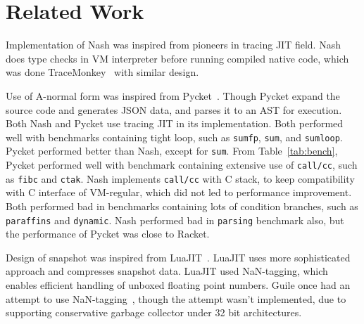 \documentclass[preprint, 10pt]{sigplanconf}
\begin{document}

\section{Related Work}
\label{sec:related}
Implementation of Nash was inspired from pioneers in tracing JIT field. Nash
does type checks in VM interpreter before running compiled native code, which
was done TraceMonkey~\cite{gal2009trace} with similar design.

Use of A-normal form was inspired from Pycket~\cite{bauman2015pycket}. Though
Pycket expand the source code and generates JSON data, and parses it to an AST
for execution.  Both Nash and Pycket use tracing JIT in its implementation. Both
performed well with benchmarks containing tight loop, such as \texttt{sumfp},
\texttt{sum}, and \texttt{sumloop}. Pycket performed better than Nash, except
for \texttt{sum}. From Table~\hyperref[tab:bench]{\ref{tab:bench}}, Pycket
performed well with benchmark containing extensive use of \texttt{call/cc}, such
as \texttt{fibc} and \texttt{ctak}. Nash implements \texttt{call/cc} with C
stack, to keep compatibility with C interface of VM-regular, which did not led
to performance improvement. Both performed bad in benchmarks containing lots of
condition branches, such as \texttt{paraffins} and \texttt{dynamic}. Nash
performed bad in \texttt{parsing} benchmark also, but the performance of Pycket
was close to Racket.

Design of snapshot was inspired from LuaJIT~\cite{pall2009ip}. LuaJIT uses more
sophisticated approach and compresses snapshot data. LuaJIT used NaN-tagging,
which enables efficient handling of unboxed floating point numbers. Guile once
had an attempt to use NaN-tagging~\cite{wingo2011value}, though the attempt
wasn't implemented, due to supporting conservative garbage collector under 32
bit architectures.
\end{document}
